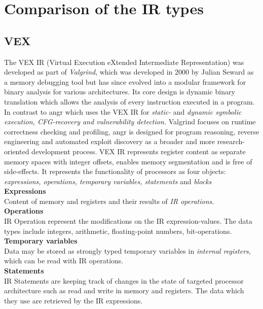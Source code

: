 \documentclass[seminar]{plai}
\begin{document}
\section{Comparison of the IR types}
\label{sec:comparison-of-the-ir-types}

\subsection{VEX}
\label{sec:vex-comparison-of-IRs}
The VEX IR (Virtual Execution eXtended Intermediate Representation) was developed as part of \textit{Valgrind}, which was developed in 2000 by Julian Seward as a memory debugging tool but has since evolved into a modular framework for binary analysis for various architectures. Its core design is dynamic binary translation which allows the analysis of every instruction executed in a program. In contrast to angr which uses the VEX IR for \textit{static-} and \textit{dynamic symbolic execution, CFG-recovery and vulnerability detection.}
Valgrind focuses on runtime correctness checking and profiling, angr is designed for program reasoning, reverse engineering and automated exploit discovery as a broader and more research-oriented development process.
VEX IR represents register content as separate memory spaces with integer offsets, enables memory segmentation and is free of side-effects.
It represents the functionality of processors as four objects: \textit{expressions, operations, temporary variables, statements} and \textit{blocks}\\

\noindent\textbf{Expressions}\\
Content of memory and registers and their results of \textit{IR operations}.\\

\noindent\textbf{Operations}\\
IR Operation represent the modifications on the IR expression-values.
The data types include integers, arithmetic, floating-point numbers, bit-operations.\\

\noindent\textbf{Temporary variables}\\
Data may be stored as strongly typed temporary variables in \textit{internal registers}, which can be read with IR operations.\\

\noindent\textbf{Statements}\\
IR Statements are keeping track of changes in the state of targeted processor architecture such as read and write in memory and registers. The data which they use are retrieved by the IR expressions.\\
\end{document}
